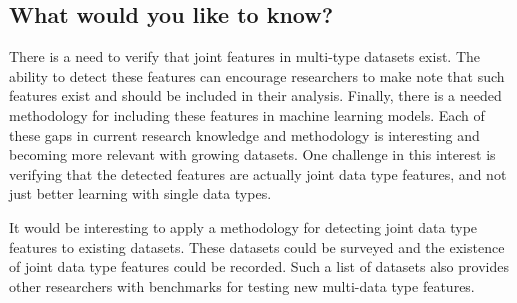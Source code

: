 \subsection{What would you like to know?}

There is a need to verify that joint features in multi-type datasets exist. The ability to detect these features can encourage researchers to make note that such features exist and should be included in their analysis.  Finally, there is a needed methodology for including these features in machine learning models.  Each of these gaps in current research knowledge and methodology is interesting and becoming more relevant with growing datasets.  One challenge in this interest is verifying that the detected features are actually joint data type features, and not just better learning with single data types.  

It would be interesting to apply a methodology for detecting joint data type features to existing datasets.  These datasets could be surveyed and the existence of joint data type features could be recorded.  Such a list of datasets also provides other researchers with benchmarks for testing new multi-data type features.  

